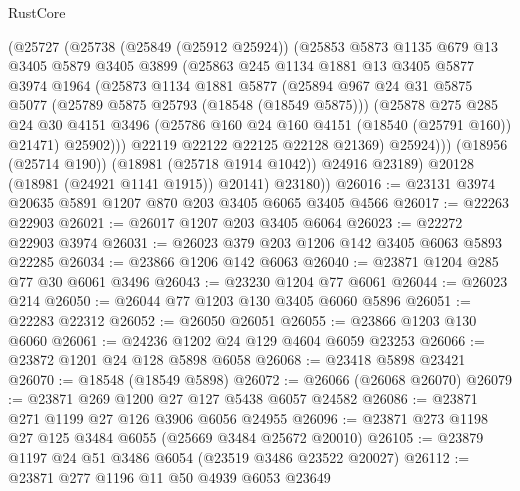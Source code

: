 \begin{lexlean}{RustCore}
\begin{coremodule}
            (@25727
              (@25738
                (@25849 (@25912 @25924))
                (@25853
                  @5873
                  @1135
                  @679
                  @13
                  @3405
                  @5879
                  @3405
                  @3899
                  (@25863
                    @245
                    @1134
                    @1881
                    @13
                    @3405
                    @5877
                    @3974
                    @1964
                    (@25873
                      @1134
                      @1881
                      @5877
                      (@25894
                        @967
                        @24
                        @31
                        @5875
                        @5077
                        (@25789 @5875 @25793 (@18548 (@18549 @5875)))
                        (@25878
                          @275
                          @285
                          @24
                          @30
                          @4151
                          @3496
                          (@25786 @160 @24 @160 @4151 (@18540 (@25791 @160)) @21471)
                          @25902)))
                    @22119
                    @22122
                    @22125
                    @22128
                    @21369)
                  @25924)))
            (@18956 (@25714 @190))
            (@18981 (@25718 @1914 @1042))
            @24916
            @23189)
          @20128
          (@18981 (@24921 @1141 @1915))
          @20141)
        @23180))
@26016 := @23131 @3974 @20635 @5891 @1207 @870 @203 @3405 @6065 @3405 @4566
@26017 := @22263 @22903
@26021 := @26017 @1207 @203 @3405 @6064
@26023 := @22272 @22903 @3974
@26031 := @26023 @379 @203 @1206 @142 @3405 @6063 @5893 @22285
@26034 := @23866 @1206 @142 @6063
@26040 := @23871 @1204 @285 @77 @30 @6061 @3496
@26043 := @23230 @1204 @77 @6061
@26044 := @26023 @214
@26050 := @26044 @77 @1203 @130 @3405 @6060 @5896
@26051 := @22283 @22312
@26052 := @26050 @26051
@26055 := @23866 @1203 @130 @6060
@26061 := @24236 @1202 @24 @129 @4604 @6059 @23253
@26066 := @23872 @1201 @24 @128 @5898 @6058
@26068 := @23418 @5898 @23421
@26070 := @18548 (@18549 @5898)
@26072 := @26066 (@26068 @26070)
@26079 := @23871 @269 @1200 @27 @127 @5438 @6057 @24582
@26086 := @23871 @271 @1199 @27 @126 @3906 @6056 @24955
@26096 := @23871 @273 @1198 @27 @125 @3484 @6055 (@25669 @3484 @25672 @20010)
@26105 := @23879 @1197 @24 @51 @3486 @6054 (@23519 @3486 @23522 @20027)
@26112 := @23871 @277 @1196 @11 @50 @4939 @6053 @23649

\end{coremodule}
\end{lexlean}
